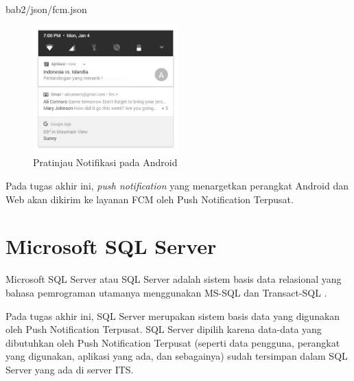  {bab2/json/fcm.json}
\begin{figure}[H]
	\centering\includegraphics[width=0.5\textwidth]{bab2/img/fcm.jpg}
	\caption{Pratinjau Notifikasi pada Android}
	\label{img:contoh-hasil-fcm}
\end{figure}
\par Pada tugas akhir ini, \textit{push notification} yang menargetkan perangkat Android dan Web akan dikirim ke layanan FCM oleh Push Notification Terpusat.

\section{Microsoft SQL Server}
\par Microsoft SQL Server atau SQL Server adalah sistem basis data relasional yang bahasa pemrograman utamanya menggunakan MS-SQL dan Transact-SQL \cite{sqlserver-thesis}.
\par Pada tugas akhir ini, SQL Server merupakan sistem basis data yang digunakan oleh Push Notification Terpusat. SQL Server dipilih karena data-data yang dibutuhkan oleh Push Notification Terpusat (seperti data pengguna, perangkat yang digunakan, aplikasi yang ada, dan sebagainya) sudah tersimpan dalam SQL Server yang ada di server ITS.

